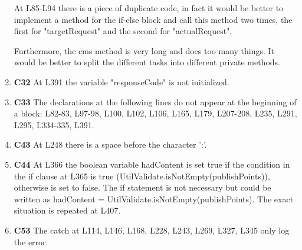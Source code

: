 \begin{enumerate}
	At L85-L94 there is a piece of duplicate code, in fact it would be better to implement a method for the if-else block and call this method two times, the first for "targetRequest" and the second for "actualRequest".
	
	Furthermore, the cms method is very long and does too many things. It would be better to split the different tasks into different private methods.
\item \textbf{C32} At L391 the variable "responseCode" is not initialized.
\item \textbf{C33} The declarations at the following lines do not appear at the beginning of a block: L82-83, L97-98, L100, L102, L106, L165, L179, L207-208, L235, L291, L295, L334-335, L391. 
\item \textbf{C43} At L248 there is a space before the character ':'.
\item \textbf{C44} At L366 the boolean variable hadContent is set true if the condition in the if clause at L365 is true (UtilValidate.isNotEmpty(publishPoints)), otherwise is set to false. The if statement is not necessary but could be written as hadContent = UtilValidate.isNotEmpty(publishPoints). The exact situation is repeated at L407.
\item \textbf{C53} The catch at L114, L146, L168, L228, L243, L269, L327, L345 only log the error.
\end{enumerate}